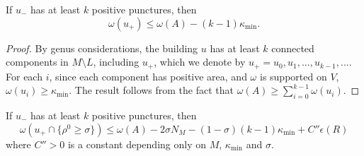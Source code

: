 \documentclass{article}
\numberwithin{equation}{section}
\numberwithin{figure}{section}
\begin{document}
\begin{lem}
\label{area_bound_simple}
If $u_-$ has at least $k$ positive punctures, then 
\begin{equation}
\omega(u_+)\leq \omega(A)-(k-1)\kappa_{\min}.
\end{equation}
\end{lem}
\begin{proof}
By genus considerations, the building $u$ has at least $k$ connected components in $M\setminus L$, including $u_+$, which we denote by $u_+=u_0,u_1,...,u_{k-1},...$. For each $i$, since each component has positive area, and $\omega$ is supported on $V$, $\omega(u_i)\geq \kappa_{\min}$. The result follows from the fact that $\omega(A)\geq \sum_{i=0}^{k-1}\omega(u_i)$.
\end{proof}
\begin{lem}
If $u_-$ has at least $k$ positive punctures, then
\begin{equation}
\omega(u_+\cap \{\rho^0\geq \sigma\})\leq \omega(A)-2\sigma N_M-(1-\sigma)(k-1)\kappa_{\min}+C''\epsilon(R)
\end{equation}
where $C''>0$ is a constant depending only on $M$, $\kappa_{\min}$ and $\sigma$.
\label{area_bound_advanced}
\end{lem}
\end{document}
